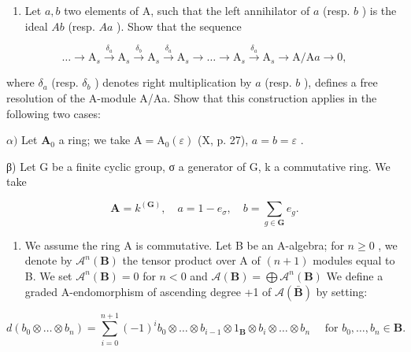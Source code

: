 
\begin{enumerate}
\def\labelenumi{\arabic{enumi})}
\tightlist
\item
  Let \(a, b\) two elements of A, such that the left annihilator of \(a\) (resp. \(b\) ) is the ideal \(Ab\) (resp. \(Aa\) ). Show that the sequence
\end{enumerate}

\[
\dots \longrightarrow \mathrm{A} _ {s} \xrightarrow {\delta_ {a}} \mathrm{A} _ {s} \xrightarrow {\delta_ {b}} \mathrm{A} _ {s} \xrightarrow {\delta_ {a}} \mathrm{A} _ {s} \longrightarrow \dots \longrightarrow \mathrm{A} _ {s} \xrightarrow {\delta_ {a}} \mathrm{A} _ {s} \longrightarrow \mathrm{A} / \mathrm{A} a \longrightarrow 0,
\]

where \(\delta_{a}\) (resp. \(\delta_{b}\) ) denotes right multiplication by \(a\) (resp. \(b\) ), defines a free resolution of the A-module A/Aa. Show that this construction applies in the following two cases:

\(\alpha)\) Let \(\mathbf{A}_0\) a ring; we take \(\mathrm{A} = \mathrm{A}_0(\varepsilon)\) (X, p. 27), \(a = b = \varepsilon\) .

β) Let G be a finite cyclic group, σ a generator of G, k a commutative ring. We take

\[
\mathbf {A} = k ^ {(\mathbf {G})}, \quad a = 1 - e _ {\sigma}, \quad b = \sum_ {g \in \mathbf {G}} e _ {g}.
\]

\begin{enumerate}
\def\labelenumi{\arabic{enumi})}
\setcounter{enumi}{1}
\tightlist
\item
  We assume the ring A is commutative. Let B be an A-algebra; for \(n \geqslant 0\) , we denote by \(\mathcal{A}^{n}(\mathbf{B})\) the tensor product over A of \((n + 1)\) modules equal to B. We set \(\mathcal{A}^{n}(\mathbf{B}) = 0\) for \(n < 0\) and \(\mathcal{A}(\mathbf{B}) = \bigoplus \mathcal{A}^{n}(\mathbf{B})\) We define a graded A-endomorphism of ascending degree +1 of \(\mathcal{A}(\bar{\mathbf{B}})\) by setting:
\end{enumerate}

\[
d (b _ {0} \otimes \dots \otimes b _ {n}) = \sum_ {i = 0} ^ {n + 1} (- 1) ^ {i} b _ {0} \otimes \dots \otimes b _ {i - 1} \otimes 1 _ {\mathbf {B}} \otimes b _ {i} \otimes \dots \otimes b _ {n} \quad \text { for } b _ {0}, \dots , b _ {n} \in \mathbf {B}.
\]

